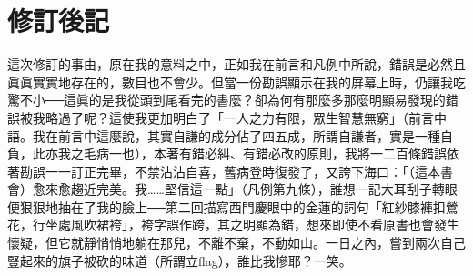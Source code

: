 \chapter*{修訂後記}

這次修訂的事由，原在我的意料之中，正如我在前言和凡例中所說，錯誤是必然且眞眞實實地存在的，數目也不會少。但當一份勘誤顯示在我的屏幕上時，仍讓我吃驚不小──這眞的是我從頭到尾看完的書麼？卻為何有那麼多那麼明顯易發現的錯誤被我略過了呢？這使我更加明白了「一人之力有限，眾生智慧無窮」{\kaishu（前言中語。我在前言中這麼說，其實自謙的成分佔了四五成，所謂自謙者，實是一種自負，此亦我之毛病一也）}，本著有錯必糾、有錯必改的原則，我將一二百條錯誤依著勘誤一一訂正完畢，不禁沾沾自喜，舊病登時復發了，又誇下海口：「{\kaishu（這本書會）}愈來愈趨近完美。我……堅信這一點」{\kaishu（凡例第九條）}，誰想一記大耳刮子轉眼便狠狠地抽在了我的臉上──第二回描寫西門慶眼中的金蓮的詞句「紅紗膝褲扣鶯花，行坐處風吹裙袴」，袴字誤作跨，其之明顯為錯，想來即使不看原書也會發生懷疑，但它就靜悄悄地躺在那兒，不離不棄，不動如山。一日之內，嘗到兩次自己豎起來的旗子被砍的味道{\kaishu（所謂立flag）}，誰比我慘耶？一笑。

\begin{quotation}
\end{quotation}
